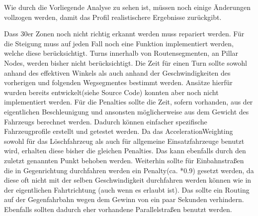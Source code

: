 Wie durch die Vorliegende Analyse zu sehen ist, müssen noch einige Änderungen vollzogen werden, damit das Profil realistischere Ergebnisse zurückgibt.\par
{}
Dass 30er Zonen noch nicht richtig erkannt werden muss repariert werden.
Für die Steigung muss auf jeden Fall noch eine Funktion implementiert werden, welche diese berücksichtigt.
Turns innerhalb von Routensegmenten, an Pillar Nodes, werden bisher nicht berücksichtigt.
Die Zeit für einen Turn sollte sowohl anhand des effektiven Winkels als auch anhand der Geschwindigkeiten des vorherigen und folgenden Wegsegmentes bestimmt werden.
Ansätze hierfür wurden bereits entwickelt(siehe Source Code) konnten aber noch nicht implementiert werden.
Für die Penalties sollte die Zeit, sofern vorhanden, aus der eigentlichen Beschleunigung und ansonsten möglicherweise aus dem Gewicht des Fahrzeugs berechnet werden.
Dadurch können einfacher spezifische Fahrzeugprofile erstellt und getestet werden.
Da das AccelerationWeighting sowohl für das Löschfahrzeug als auch für allgemeine Einsatzfahrzeuge benutzt wird, erhalten diese bisher die gleichen Penalties.
Das kann ebenfalls durch den zuletzt genannten Punkt behoben werden.
Weiterhin sollte für Einbahnstraßen die in Gegenrichtung durchfahren werden ein Penalty(ca. *0.9) gesetzt werden, da diese oft nicht mit der selben Geschwindigkeit durchfahren werden können wie in der eigentlichen Fahrtrichtung (auch wenn es erlaubt ist).
Das sollte ein Routing auf der Gegenfahrbahn wegen dem Gewinn von ein paar Sekunden verhindern.
Ebenfalls sollten dadurch eher vorhandene Parallelstraßen benutzt werden.